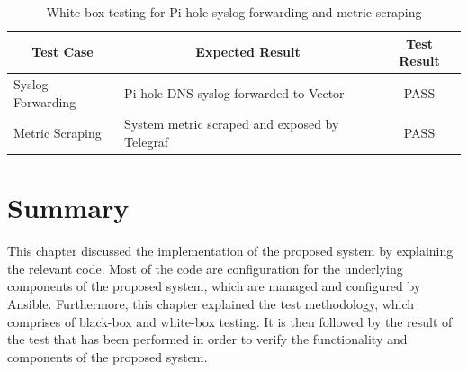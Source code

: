 \documentclass[../index.tex]{subfiles}
\begin{document}
\begin{table}[h!]
  \begin{tabularx}{\textwidth}{|m{8em}|X|c|} 
    \hline
    \multicolumn{1}{|c|}{Test Case} & \multicolumn{1}{c|}{Expected Result} & \multicolumn{1}{c|}{Test Result} \\
    \hline
    Syslog Forwarding               & Pi-hole DNS syslog forwarded to Vector & PASS \\ 
    Metric Scraping                 & System metric scraped and exposed by Telegraf & PASS \\ 
    \hline
  \end{tabularx}
  \caption{White-box testing for Pi-hole syslog forwarding and metric scraping}
  \label{table:whitebox_pihole}
\end{table}

\section{Summary}

This chapter discussed the implementation of the proposed system by explaining the relevant code.
Most of the code are configuration for the underlying components of the proposed system, which are
managed and configured by Ansible. Furthermore, this chapter explained the test methodology, which
comprises of black-box and white-box testing. It is then followed by the result of the test that has
been performed in order to verify the functionality and components of the proposed system.

\end{document}
